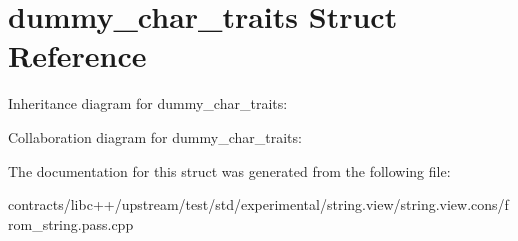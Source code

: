 \hypertarget{structdummy__char__traits}{}\section{dummy\+\_\+char\+\_\+traits Struct Reference}
\label{structdummy__char__traits}


Inheritance diagram for dummy\+\_\+char\+\_\+traits\+:


Collaboration diagram for dummy\+\_\+char\+\_\+traits\+:


The documentation for this struct was generated from the following file\+:\begin{DoxyCompactItemize}
\item 
contracts/libc++/upstream/test/std/experimental/string.\+view/string.\+view.\+cons/from\+\_\+string.\+pass.\+cpp\end{DoxyCompactItemize}
